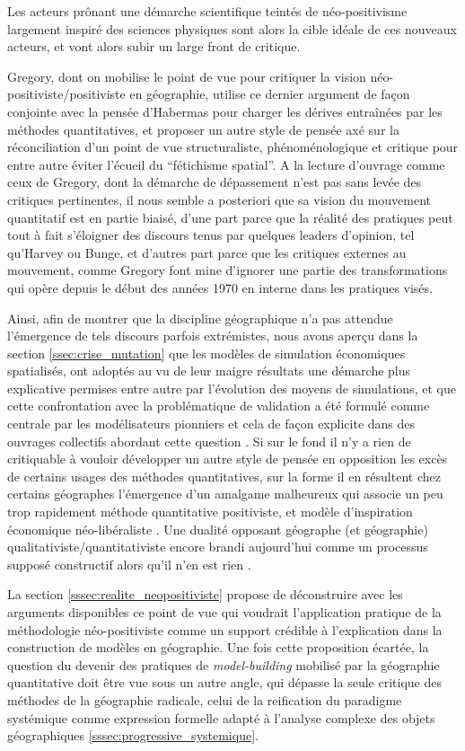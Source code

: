 Les acteurs prônant une démarche scientifique teintés de néo-positivisme largement inspiré des sciences physiques sont alors la cible idéale de ces nouveaux acteurs, et vont alors subir un large front de critique. 

Gregory, dont on mobilise le point de vue pour critiquer la vision néo-positiviste/positiviste en géographie, utilise ce dernier argument de façon conjointe avec la pensée d'Habermas pour charger les dérives entraînées par les méthodes quantitatives, et proposer un autre style de pensée axé sur la réconciliation d'un point de vue structuraliste, phénoménologique et critique pour entre autre éviter l'écueil du \enquote{fétichisme spatial}. A la lecture d'ouvrage comme ceux de Gregory, dont la démarche de dépassement n'est pas sans levée des critiques pertinentes, il nous semble a posteriori que sa vision du mouvement quantitatif est en partie biaisé, d'une part parce que la réalité des pratiques peut tout à fait s'éloigner des discours tenus par quelques leaders d'opinion, tel qu'Harvey ou Bunge, et d'autres part parce que les critiques externes au mouvement, comme Gregory font mine d'ignorer une partie des transformations qui opère depuis le début des années 1970 en interne dans les pratiques visés. 

Ainsi, afin de montrer que la discipline géographique n'a pas attendue l'émergence de tels discours parfois extrémistes, nous avons aperçu dans la section \ref{ssec:crise_mutation} que les modèles de simulation économiques spatialisés, ont adoptés au vu de leur maigre résultats une démarche plus explicative permises entre autre par l'évolution des moyens de simulations, et que cette confrontation avec la problématique de validation a été formulé comme centrale par les modélisateurs pionniers et cela de façon explicite dans des ouvrages collectifs abordant cette question \autocite{Marble1972}. Si sur le fond il n'y a rien de critiquable à vouloir développer un autre style de pensée en opposition les excès de certains usages des méthodes quantitatives, sur la forme il en résultent chez certains géographes l'émergence d'un amalgame malheureux qui associe un peu trop rapidement méthode quantitative positiviste, et modèle d'inspiration économique néo-libéraliste \autocite[61-64]{Paterson1984}. Une dualité opposant géographe (et géographie) qualitativiste/quantitativiste encore brandi aujourd'hui comme un processus supposé constructif alors qu'il n'en est rien \autocite{Sheppard2001}.

La section \ref{sssec:realite_neopositiviste} propose de déconstruire avec les arguments disponibles ce point de vue qui voudrait l'application pratique de la méthodologie néo-positiviste comme un support crédible à l'explication dans la construction de modèles en géographie. Une fois cette proposition écartée, la question du devenir des pratiques de \textit{model-building} mobilisé par la géographie quantitative doit être vue sous un autre angle, qui dépasse la seule critique des méthodes de la géographie radicale, celui de la reification du paradigme systémique comme expression formelle adapté à l'analyse complexe des objets géographiques \ref{sssec:progressive_systemique}.

